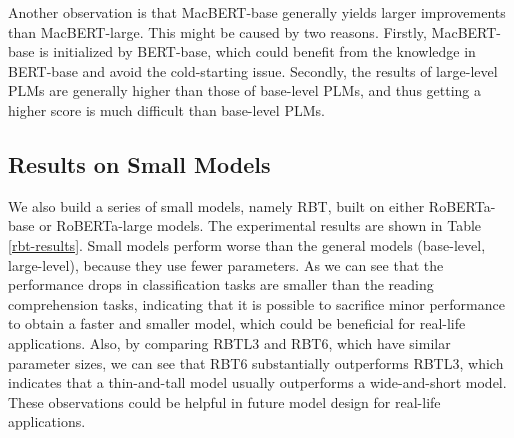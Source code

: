 \documentclass[journal]{IEEEtran}
\begin{document}
\begin{CJK*}{UTF8}{gbsn}
Another observation is that MacBERT-base generally yields larger improvements than MacBERT-large. This might be caused by two reasons. Firstly, MacBERT-base is initialized by BERT-base, which could benefit from the knowledge in BERT-base and avoid the cold-starting issue. Secondly, the results of large-level PLMs are generally higher than those of base-level PLMs, and thus getting a higher score is much difficult than base-level PLMs.

\subsection{Results on Small Models}
We also build a series of small models, namely RBT, built on either RoBERTa-base or RoBERTa-large models.
The experimental results are shown in Table \ref{rbt-results}.
Small models perform worse than the general models (base-level, large-level), because they use fewer parameters.
As we can see that the performance drops in classification tasks are smaller than the reading comprehension tasks, indicating that it is possible to sacrifice minor performance to obtain a faster and smaller model, which could be beneficial for real-life applications.
Also, by comparing RBTL3 and RBT6, which have similar parameter sizes, we can see that RBT6 substantially outperforms RBTL3, which indicates that a thin-and-tall model usually outperforms a wide-and-short model.
These observations could be helpful in future model design for real-life applications.


\end{CJK*}
\end{document}
